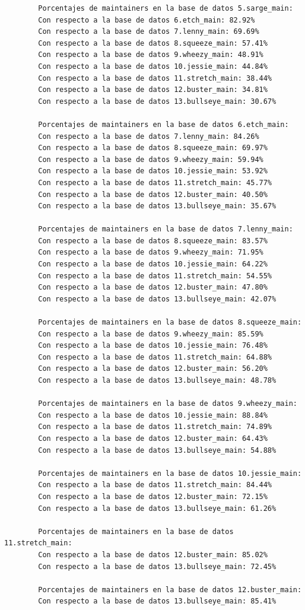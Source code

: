 \documentclass[a4paper, 12pt]{book}
\begin{document}
\begin{verbatim}
		Porcentajes de maintainers en la base de datos 5.sarge_main:
		Con respecto a la base de datos 6.etch_main: 82.92%
		Con respecto a la base de datos 7.lenny_main: 69.69%
		Con respecto a la base de datos 8.squeeze_main: 57.41%
		Con respecto a la base de datos 9.wheezy_main: 48.91%
		Con respecto a la base de datos 10.jessie_main: 44.84%
		Con respecto a la base de datos 11.stretch_main: 38.44%
		Con respecto a la base de datos 12.buster_main: 34.81%
		Con respecto a la base de datos 13.bullseye_main: 30.67%
		
		Porcentajes de maintainers en la base de datos 6.etch_main:
		Con respecto a la base de datos 7.lenny_main: 84.26%
		Con respecto a la base de datos 8.squeeze_main: 69.97%
		Con respecto a la base de datos 9.wheezy_main: 59.94%
		Con respecto a la base de datos 10.jessie_main: 53.92%
		Con respecto a la base de datos 11.stretch_main: 45.77%
		Con respecto a la base de datos 12.buster_main: 40.50%
		Con respecto a la base de datos 13.bullseye_main: 35.67%
		
		Porcentajes de maintainers en la base de datos 7.lenny_main:
		Con respecto a la base de datos 8.squeeze_main: 83.57%
		Con respecto a la base de datos 9.wheezy_main: 71.95%
		Con respecto a la base de datos 10.jessie_main: 64.22%
		Con respecto a la base de datos 11.stretch_main: 54.55%
		Con respecto a la base de datos 12.buster_main: 47.80%
		Con respecto a la base de datos 13.bullseye_main: 42.07%
		
		Porcentajes de maintainers en la base de datos 8.squeeze_main:
		Con respecto a la base de datos 9.wheezy_main: 85.59%
		Con respecto a la base de datos 10.jessie_main: 76.48%
		Con respecto a la base de datos 11.stretch_main: 64.88%
		Con respecto a la base de datos 12.buster_main: 56.20%
		Con respecto a la base de datos 13.bullseye_main: 48.78%
		
		Porcentajes de maintainers en la base de datos 9.wheezy_main:
		Con respecto a la base de datos 10.jessie_main: 88.84%
		Con respecto a la base de datos 11.stretch_main: 74.89%
		Con respecto a la base de datos 12.buster_main: 64.43%
		Con respecto a la base de datos 13.bullseye_main: 54.88%
		
		Porcentajes de maintainers en la base de datos 10.jessie_main:
		Con respecto a la base de datos 11.stretch_main: 84.44%
		Con respecto a la base de datos 12.buster_main: 72.15%
		Con respecto a la base de datos 13.bullseye_main: 61.26%
		
		Porcentajes de maintainers en la base de datos 11.stretch_main:
		Con respecto a la base de datos 12.buster_main: 85.02%
		Con respecto a la base de datos 13.bullseye_main: 72.45%
		
		Porcentajes de maintainers en la base de datos 12.buster_main:
		Con respecto a la base de datos 13.bullseye_main: 85.41%
	\end{verbatim} 
	
\end{document}
